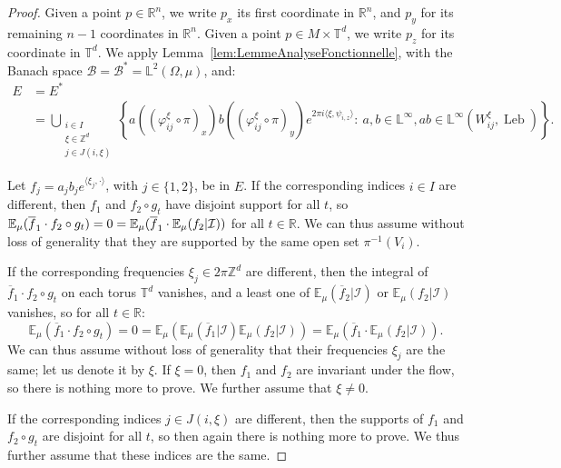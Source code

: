 \documentclass[10pt]{amsart}
\theoremstyle{definition}\newtheorem{defi}[theo]{Definition}\newtheorem{rema}[theo]{Remark}\newtheorem{exam}[theo]{Example}\newtheorem{exem}[theo]{Example}\newtheorem{nota}[theo]{Notation}
\DeclareMathOperator{\Leb}{Leb}
\newcommand{\Z}{\mathbb{Z}}
\newcommand{\R}{\mathbb{R}}
\newcommand{\Ebb}{\mathbb{E}}
\newcommand{\Lbb}{\mathbb{L}}
\newcommand{\Tbb}{\mathbb{T}}
\newcommand{\Bcal}{\mathcal{B}}
\newcommand{\Ical}{\mathcal{I}}
\begin{document}
\begin{proof}
Given a point $p \in \R^n$, we write $p_x$ its first coordinate in $\R^n$, and $p_y$ for its remaining $n-1$ coordinates in $\R^n$. Given a point $p \in M \times \Tbb^d$, we write $p_z$ for its coordinate in $\Tbb^d$. We apply Lemma~\ref{lem:LemmeAnalyseFonctionnelle}, with the Banach space $\Bcal = \Bcal^* = \Lbb^2 (\Omega, \mu)$, and:
\begin{align*}
E & = E^* \\
& = \bigcup_{\substack{i \in I \\ \xi \in \Z^d \\ j \in J (i,\xi)}} \left\{a \left((\varphi_{ij}^\xi \circ \pi)_x\right) b \left((\varphi_{ij}^\xi \circ \pi)_y\right) e^{2\pi i \langle \xi, \psi_{i,z} \rangle} :\!\ a, b \in \Lbb^\infty, ab \in \Lbb^\infty \left(W_{ij}^\xi, \Leb\right) \right\}.
\end{align*}


Let $f_j = a_j b_j e^{\langle \xi_j, \cdot \rangle}$, with $j \in \{1,2\}$, be in $E$. If the corresponding indices $i \in I$ are different, then $f_1$ and $f_2 \circ g_t$ have disjoint support for all $t$, so $\Ebb_\mu (\overline{f}_1 \cdot f_2 \circ g_t) = 0\linebreak= \Ebb_\mu (\overline{f}_1 \cdot \Ebb_\mu (f_2 | \Ical))$ for all $t \in \R$. We can thus assume without loss of generality that they are supported by the same open set $\pi^{-1} (V_i)$.


If the corresponding frequencies $\xi_j \in 2\pi\Z^d$ are different, then the integral of $\overline{f}_1 \cdot f_2 \circ g_t$ on each torus $\Tbb^d$ vanishes, and a least one of $\Ebb_\mu (\overline{f}_2 | \Ical)$ or $\Ebb_\mu (f_2 | \Ical)$ vanishes, so for all $t \in \R$:
\[
\Ebb_\mu \left(\overline{f}_1 \cdot f_2 \circ g_t\right) = 0 = \Ebb_\mu \left(\Ebb_\mu (\overline{f}_1 | \Ical) \Ebb_\mu (f_2 | \Ical)\right) = \Ebb_\mu \left(\overline{f}_1 \cdot \Ebb_\mu (f_2 | \Ical)\right).
\]
We can thus assume without loss of generality that their frequencies $\xi_j$ are the same; let us denote it by $\xi$. If $\xi = 0$, then $f_1$ and $f_2$ are invariant under the flow, so there is nothing more to prove. We further assume that $\xi \neq 0$.


If the corresponding indices $j \in J(i, \xi)$ are different, then the supports of $f_1$ and $f_2 \circ g_t$ are disjoint for all $t$, so then again there is nothing more to prove. We thus further assume that these indices are the same.


\end{proof}
\end{document}
